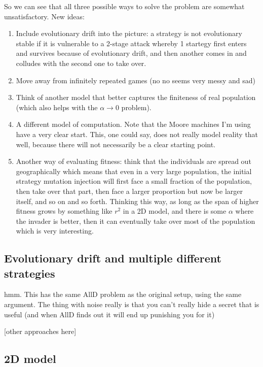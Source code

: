 \documentclass[11pt]{amsart}
\theoremstyle{definition}
\theoremstyle{remark}
\begin{document}
So we can see that all three possible ways to solve the problem are somewhat unsatisfactory. New ideas:
\begin{enumerate}
  \item Include evolutionary drift into the picture: a strategy is not evolutionary stable if it is vulnerable to a 2-stage attack whereby 1 startegy first enters and survives because of evolutionary drift, and then another comes in and colludes with the second one to take over.
  \item Move away from infinitely repeated games (no no seems very messy and sad)
  \item Think of another model that better captures the finiteness of real population (which also helps with the $\alpha \to 0$ problem).
  \item A different model of computation. Note that the Moore machines I'm using have a very clear start. This, one could say, does not really model reality that well, because there will not necessarily be a clear starting point.
  \item Another way of evaluating fitness: think that the individuals are spread out geographically which means that even in a very large population, the initial strategy mutation injection will first face a small fraction of the population, then take over that part, then face a larger proportion but now be larger itself, and so on and so forth. Thinking this way, as long as the span of higher fitness grows by something like $r^2$ in a 2D model, and there is some $\alpha$ where the invader is better, then it can eventually take over most of the population which is very interesting.
\end{enumerate}

\subsection*{Evolutionary drift and multiple different strategies}

hmm. This has the same AllD problem as the original setup, using the same argument. The thing with noise really is that you can't really hide a secret that is useful (and when AllD finds out it will end up punishing you for it)


[other approaches here]


\subsection*{2D model}
\end{document}
